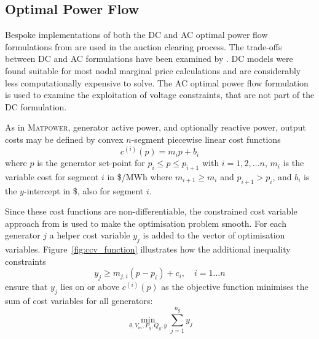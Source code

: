 \subsection{Optimal Power Flow}
\label{sec:pw_linear}
Bespoke implementations of both the DC and AC optimal power flow formulations
from \matpower are used in the auction clearing process. The trade-offs between
DC and AC formulations have been examined by .  DC models
were found suitable for most nodal marginal price calculations and are
considerably less computationally expensive to solve.  The AC optimal power
flow formulation is used to examine the exploitation of voltage
constraints, that are not part of the DC formulation.

%

As in \textsc{Matpower}, generator active power, and optionally reactive power,
output costs may be defined by convex $n$-segment piecewise linear cost
functions
\begin{equation}
c^{(i)}(p) = m_ip + b_i
\end{equation}
where $p$ is the generator set-point for $p_i \leq p \leq p_{i+1}$ with
$i = 1,2,\dotsc n$, $m_i$ is the variable cost for segment $i$ in
\$/MWh where $m_{i+1} \geq m_i$ and $p_{i+1} > p_i$, and $b_i$ is the
$y$-intercept in \$, also for segment $i$.


Since these cost functions are non-differentiable, the constrained cost variable
approach from  is used to make the optimisation problem
smooth.  For each generator $j$ a helper cost variable $y_j$ is added to the
vector of optimisation variables.  Figure~\ref{fig:ccv_function}
\cite[Figure5-3]{pserc:mp_manual} illustrates how the additional inequality
constraints
\begin{equation}
y_j \geq m_{j,i}(p-p_i) + c_i, \quad i = 1\dotsc n
\end{equation}
ensure that $y_j$ lies on or above $c^{(i)}(p)$ as the objective function
minimises the sum of cost variables for all generators:
\begin{equation}
\min_{\theta, V_m, P_g, Q_g, y} \sum_{j=1}^{n_g}y_j
\end{equation}

